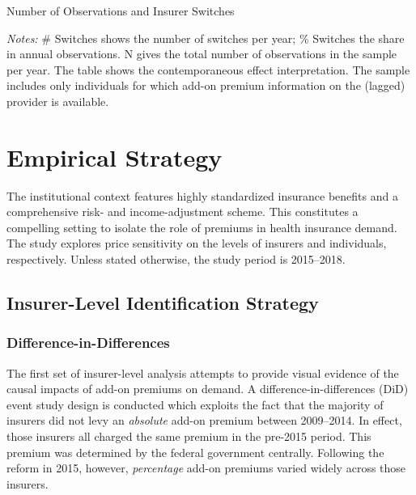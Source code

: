 \documentclass[a4paper, 11pt, english]{article}
\begin{document}
\begin{table}[H]
	\caption*{Number of Observations and Insurer Switches} \label{tab:individualswitches}
	\begin{adjustbox}{width=\textwidth}
		
	\end{adjustbox}
	\begin{minipage}{\textwidth}
		\vspace{3pt}
		\small \textit{Notes:} \# Switches shows the number of switches per year; \% Switches the share in annual observations. N gives the total number of observations in the sample per year. The table shows the contemporaneous effect interpretation. The sample includes only individuals for which add-on premium information on the (lagged) provider is available.
	\end{minipage}
\end{table}


\section{Empirical Strategy \label{sec:strategy}}
The institutional context features highly standardized insurance benefits and a comprehensive risk- and income-adjustment scheme. This constitutes a compelling setting to isolate the role of premiums in health insurance demand. The study explores price sensitivity on the levels of insurers and individuals, respectively. Unless stated otherwise, the study period is 2015--2018.

\subsection{Insurer-Level Identification Strategy \label{subsec:strategy_provider}}

\subsubsection*{Difference-in-Differences} 

The first set of insurer-level analysis attempts to provide visual evidence of the causal impacts of add-on premiums on demand. A difference-in-differences (DiD) event study design is conducted which exploits the fact that the majority of insurers did not levy an \textit{absolute} add-on premium between 2009--2014. In effect, those insurers all charged the same premium in the pre-2015 period. This premium was determined by the federal government centrally. Following the reform in 2015, however, \textit{percentage} add-on premiums varied widely across those insurers. 
\end{document}

